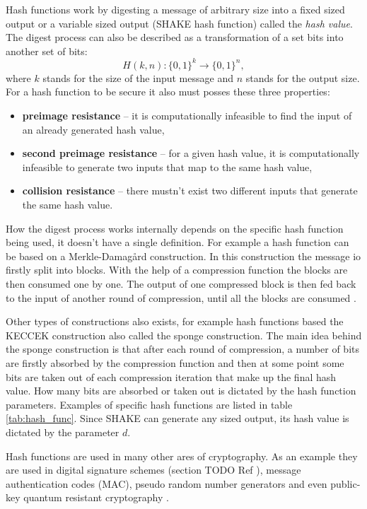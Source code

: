 Hash functions work by digesting a message of arbitrary size into a fixed sized output or a variable sized output (SHAKE hash function) called the \textit{hash value}. The digest process can also be described as a transformation of a set bits into another set of bits:
\begin{equation}
  H(k, n): \{0,1\}^k \rightarrow \{0,1\}^n,
\end{equation}
where $k$ stands for the size of the input message and $n$ stands for the output size. For a hash function to be secure it also must posses these three properties\cite{Paar2010}:
\begin{itemize}
  \item \textbf{preimage resistance} -- it is computationally infeasible to find the input of an already generated hash value,
  \item \textbf{second preimage resistance} -- for a given hash value, it is computationally infeasible to generate two inputs that map to the same hash value,
  \item \textbf{collision resistance} -- there mustn't exist two different inputs that generate the same hash value.
\end{itemize}

How the digest process works internally depends on the specific hash function being used, it doesn't have a single definition. For example a hash function can be based on a Merkle-Damag\aa rd construction. In this construction the message io firstly split into blocks. With the help of a compression function the blocks are then consumed one by one. The output of one compressed block is then fed back to the input of another round of compression, until all the blocks are consumed \cite{Smart2004}. 

Other types of constructions also exists, for example hash functions based the KECCEK construction also called the sponge construction. The main idea behind the sponge construction is that after each round of compression, a number of bits are firstly absorbed by the compression function and then at some point some bits are taken out of each compression iteration that make up the final hash value. How many bits are absorbed or taken out is dictated by the hash function parameters. \cite{1Od8f4TuMxetfmHu} Examples of specific hash functions are listed in table \ref{tab:hash_func}. Since SHAKE can generate any sized output, its hash value is dictated by the parameter $d$.


Hash functions are used in many other ares of cryptography. As an example they are used in digital signature schemes (section TODO Ref ), message authentication codes (\acs{MAC}), pseudo random number generators and even public-key quantum resistant cryptography \cite{Chen2016}. 


